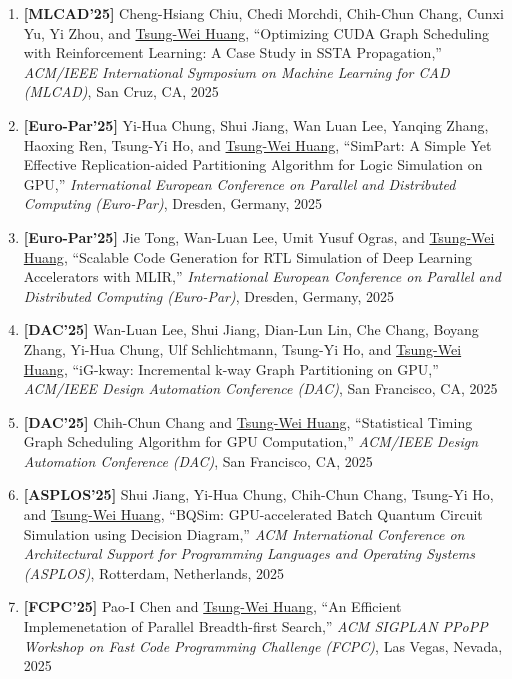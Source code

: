 \documentclass[A4,11pt]{article}
\begin{document}
\begin{enumerate}
    \item \textbf{[MLCAD'25]} Cheng-Hsiang Chiu, Chedi Morchdi, Chih-Chun Chang, Cunxi Yu, Yi Zhou, and \underline{Tsung-Wei Huang}, ``Optimizing CUDA Graph Scheduling with Reinforcement Learning: A Case Study in SSTA Propagation,'' \textit{ACM/IEEE International Symposium on Machine Learning for CAD (MLCAD)}, San Cruz, CA, 2025
    
    \item \textbf{[Euro-Par'25]} Yi-Hua Chung, Shui Jiang, Wan Luan Lee, Yanqing Zhang, Haoxing Ren, Tsung-Yi Ho, and \underline{Tsung-Wei Huang}, ``SimPart: A Simple Yet Effective Replication-aided Partitioning Algorithm for Logic Simulation on GPU,'' \textit{International European Conference on Parallel and Distributed Computing (Euro-Par)}, Dresden, Germany, 2025
    
    \item \textbf{[Euro-Par'25]} Jie Tong, Wan-Luan Lee, Umit Yusuf Ogras, and \underline{Tsung-Wei Huang}, ``Scalable Code Generation for RTL Simulation of Deep Learning Accelerators with MLIR,'' \textit{International European Conference on Parallel and Distributed Computing (Euro-Par)}, Dresden, Germany, 2025

    \item \textbf{[DAC'25]} Wan-Luan Lee, Shui Jiang, Dian-Lun Lin, Che Chang, Boyang Zhang, Yi-Hua Chung, Ulf Schlichtmann, Tsung-Yi Ho, and \underline{Tsung-Wei Huang}, ``iG-kway: Incremental k-way Graph Partitioning on GPU,'' \textit{ACM/IEEE Design Automation Conference (DAC)}, San Francisco, CA, 2025
    
    \item \textbf{[DAC'25]} Chih-Chun Chang and \underline{Tsung-Wei Huang}, ``Statistical Timing Graph Scheduling Algorithm for GPU Computation,'' \textit{ACM/IEEE Design Automation Conference (DAC)}, San Francisco, CA, 2025

    \item \textbf{[ASPLOS'25]} Shui Jiang, Yi-Hua Chung, Chih-Chun Chang, Tsung-Yi Ho, and \underline{Tsung-Wei Huang}, ``BQSim: GPU-accelerated Batch Quantum Circuit Simulation using Decision Diagram,'' \textit{ACM International Conference on Architectural Support for Programming Languages and Operating Systems (ASPLOS)}, Rotterdam, Netherlands, 2025

    \item \textbf{[FCPC'25]} Pao-I Chen and \underline{Tsung-Wei Huang}, ``An Efficient Implemenetation of Parallel Breadth-first Search,'' \textit{ACM SIGPLAN PPoPP Workshop on Fast Code Programming Challenge (FCPC)}, Las Vegas, Nevada, 2025


\end{enumerate}
\end{document}
